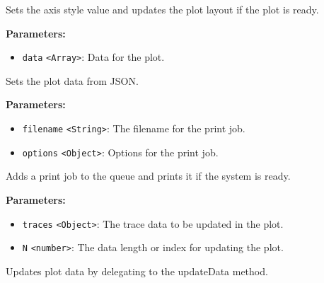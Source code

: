 \documentclass[12pt,a4paper]{article}
\begin{document}
\noindent Sets the axis style value and updates the plot layout if the plot is ready.

\vspace{5mm}
\noindent {}


\noindent \textbf{Parameters:}
\begin{itemize}
  \item \texttt{data} \texttt{<Array>}: Data for the plot.
\end{itemize}

\noindent Sets the plot data from JSON.

\vspace{5mm}
\noindent {}


\noindent \textbf{Parameters:}
\begin{itemize}
  \item \texttt{filename} \texttt{<String>}: The filename for the print job.
  \item \texttt{options} \texttt{<Object>}: Options for the print job.
\end{itemize}

\noindent Adds a print job to the queue and prints it if the system is ready.

\vspace{5mm}
\noindent {}


\noindent \textbf{Parameters:}
\begin{itemize}
  \item \texttt{traces} \texttt{<Object>}: The trace data to be updated in the plot.
  \item \texttt{N} \texttt{<number>}: The data length or index for updating the plot.
\end{itemize}

\noindent Updates plot data by delegating to the \textasciigrave{}updateData\textasciigrave{} method.

\vspace{5mm}
\noindent {}
\end{document}
